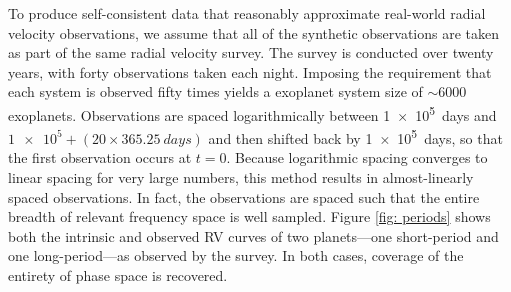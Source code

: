 \documentclass[12pt,manuscript]{aastex}
\begin{document}
To produce self-consistent data that reasonably approximate real-world radial velocity observations, we assume that all of the synthetic observations are taken as part of the same radial velocity survey.
The survey is conducted over twenty years, with forty observations taken each night.
Imposing the requirement that each system is observed fifty times yields a exoplanet system size of $\sim 6000$ exoplanets. 
Observations are spaced logarithmically between \SI{1e5}{days} and $\num{1e5} + (20 \times \SI{365.25}{days})$ and then shifted back by \SI{1e5}{days}, so that the first observation occurs at $t=0$.
Because logarithmic spacing converges to linear spacing for very large numbers, this method results in almost-linearly spaced observations.
In fact, the observations are spaced such that the entire breadth of relevant frequency space is well sampled. 
Figure \ref{fig: periods} shows both the intrinsic and observed RV curves of two planets---one short-period and one long-period---as observed by the survey.
In both cases, coverage of the entirety of phase space is recovered.
\end{document}
